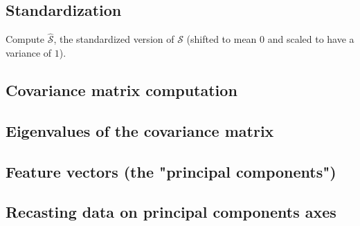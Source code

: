 \documentclass[]{article}
\begin{document}
	\subsection{Standardization}
	Compute $\hat{\mathcal{S}}$, the standardized version of $\mathcal{S}$ (shifted to mean $0$ and scaled to have a variance of $1$).
	
	\subsection{Covariance matrix computation}
	\subsection{Eigenvalues of the covariance matrix}
	\subsection{Feature vectors (the "principal components")}
	\subsection{Recasting data on principal components axes}
\end{document}
